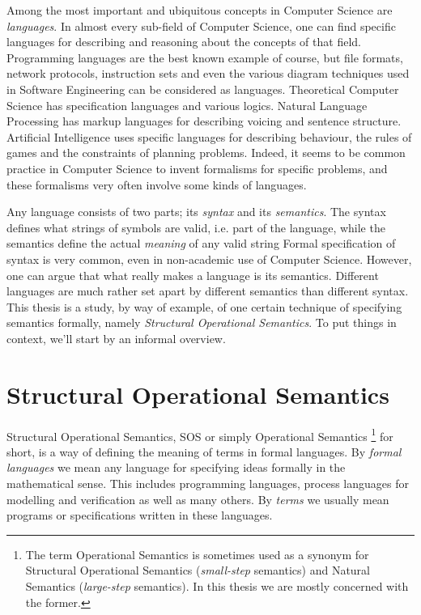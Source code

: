 Among the most important and ubiquitous concepts in Computer Science are \emph{languages}.
In almost every sub-field of Computer Science, one can find specific languages for
describing and reasoning about the concepts of that field. Programming languages
are the best known example of course, but file formats, network protocols,
instruction sets and even the various diagram techniques used in Software
Engineering can be considered as languages. Theoretical Computer Science has
specification languages and various logics. Natural Language Processing has markup
languages for describing voicing and sentence structure. Artificial Intelligence
uses specific languages for describing behaviour, the rules of games and the
constraints of planning problems. Indeed, it seems to be common practice in 
Computer Science to invent formalisms for specific problems, and these formalisms
very often involve some kinds of languages.

Any language consists of two parts; its \emph{syntax} and its \emph{semantics}.
The syntax defines what strings of symbols are valid, i.e. part of the language,
while the semantics define the actual \emph{meaning} of any valid string
Formal specification of syntax is very common, even in non-academic use of 
Computer Science. However, one can argue that what really makes a language
is its semantics. Different languages are much rather set apart by different
semantics than different syntax.
This thesis is a study, by way of example, of one certain technique of specifying
semantics formally, namely \emph{Structural Operational Semantics}. To put things
in context, we'll start by an informal overview.


\section{Structural Operational Semantics}

Structural Operational Semantics, SOS or simply Operational Semantics
\footnote{The term Operational Semantics is sometimes used as a synonym for
Structural Operational Semantics (\emph{small-step} semantics) and Natural
Semantics (\emph{large-step} semantics). In this thesis we are mostly
concerned with the former.}
for short,
is a way of defining the meaning of terms in formal languages. By
\emph{formal languages} we mean any language for specifying ideas formally in the mathematical
sense. This includes programming languages, process languages for modelling and
verification as well as many others. By \emph{terms} we usually mean programs
or specifications written in these languages.

